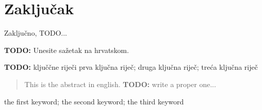 \documentclass[zavrsnirad]{fer}
\begin{document}
\chapter{Zaključak}
\label{pog:zakljucak}

Zaključno, TODO...
\blindtext








\begin{sazetak}
  \textbf{TODO:} Unesite sažetak na hrvatskom.
  \blindtext
\end{sazetak}

\begin{kljucnerijeci}
  \textbf{TODO:} ključčne riječi
  prva ključna riječ; druga ključna riječ; treća ključna riječ
\end{kljucnerijeci}


\begin{abstract}
  This is the abstract in english. \textbf{TODO:} write a proper one...
  \blindtext
\end{abstract}

\begin{keywords}
  the first keyword; the second keyword; the third keyword
\end{keywords}



\backmatter
\end{document}
